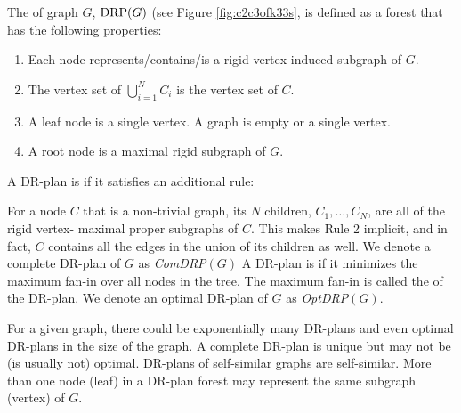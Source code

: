 %
\begin{definition}\label{def:drp}
    The  of graph
    $G$, \cite{hoffman2001decompositionI} $\text{DRP}(G)$ (see Figure \ref{fig:c2c3ofk33s}, is defined as a forest that has the
    following properties:
    \begin{enumerate}
        \item Each node represents/contains/is a rigid vertex-induced
        subgraph of $G$.
        \item The vertex set of $\bigcup_{i=1}^N{C_i}$ is the vertex
        set of $C$.
        \item A leaf node is a single vertex.
A  graph is empty or a single vertex.
        \item A root node is a maximal rigid subgraph of $G$.
    \end{enumerate}
%
%
    A DR-plan is  if it satisfies an additional rule:
        \item For a node $C$ that is  a non-trivial graph, its $N$
        children, $C_1, \ldots, C_N$, are all of the rigid vertex-
        maximal proper subgraphs of $C$. This makes Rule 2 implicit,
        and in fact, $C$ contains all the edges in the union of its
        children as well.
        We denote a complete DR-plan of $G$ as {\it
        ComDRP}$(G)$
    A DR-plan is  if it minimizes the maximum fan-in over all nodes in the tree.
    The maximum  fan-in is called the  of the DR-plan.
    We denote an optimal DR-plan of $G$ as {\it OptDRP}$(G)$.

%
\end{definition}
%
\begin{remark}
    For a given graph, there could be exponentially many  DR-plans and
    even optimal DR-plans in the size of the graph. A complete DR-plan
    is unique but may not be (is usually not) optimal. DR-plans
    of self-similar graphs are self-similar. More than one node (leaf)
    in a DR-plan forest may represent the same subgraph (vertex) of
    $G$.
\end{remark}


